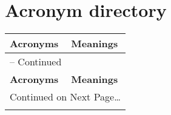 \chapter{Acronym directory}
\begin{center}
 \begin{longtable}{|ll|}
  \label{Acronym_directory}

  \\[-\textheight] %
   \hline
   \textbf{Acronyms} & \textbf{Meanings}\\
   \hline \hline
  \endfirsthead

  \multicolumn{2}{l}{{\tablename} \thetable{} -- Continued} \\
   \hline
   \textbf{Acronyms} & \textbf{Meanings}\\
   \hline \hline
  \endhead

   \multicolumn{2}{l}{{Continued on Next Page\ldots}} \\
  \endfoot

  \endlastfoot


\end{longtable}
\end{center}
